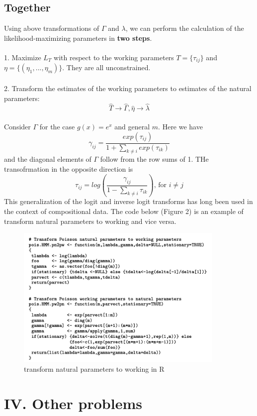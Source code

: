 \documentclass{article}
\begin{document}
\subsection*{Together}
Using above transformations of $\Gamma$ and $\lambda$, we can perform the calculation of the likelihood-maximizing parameters in \textbf{two steps}. \\
\\
1. Maximize $L_T$ with respect to the working parameters $T = \{\tau_{ij}\}$ and $\eta = \{(\eta_1, ..., \eta_m)\}$. They are all unconstrained. \\
\\
2. Transform the estimates of the working parameters to estimates of the natural parameters:
$$\hat{T} \rightarrow \hat{\Gamma}, \hat{\eta} \rightarrow \hat{\lambda}$$
\\
Consider $\Gamma$ for the case $g(x) = e^x$ and general $m$. Here we have 
$$\gamma_{ij} = \frac{exp(\tau_{ij})}{1 + \sum_{k \neq i} exp(\tau_{ik})}$$
and the diagonal elements of $\Gamma$ follow from the row sums of 1. THe transofrmation in the opposite direction is 
$$\tau_{ij} = log(\frac{\gamma_{ij}}{1 - \sum_{k \neq i} \tau_{ik}}) \text{, for } i \neq j$$
This generalization of the logit and inverse logit transforms has long been used in the context of compositional data. The code below (Figure 2) is an example of transform natural parameters to working and vice versa. \\
\begin{figure}
    \includegraphics[width = 10cm]{code for transformation.png}
    \caption{transform natural parameters to working in R}
\end{figure}

\section*{IV. Other problems}
\end{document}
